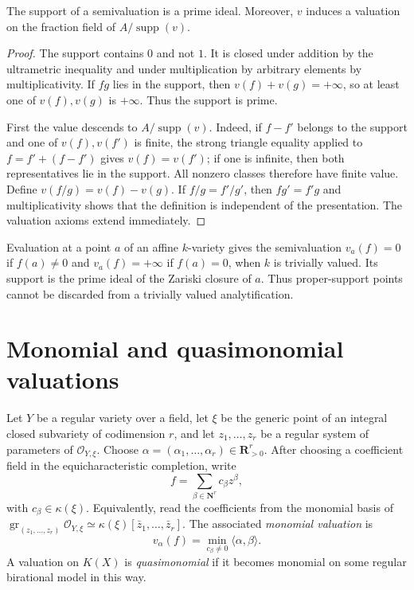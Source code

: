 \begin{proposition}
\label{prop:semivaluation-support-prime}
The support of a semivaluation is a prime ideal. Moreover, $v$ induces a
valuation on the fraction field of $A/\operatorname{supp}(v)$.
\end{proposition}
\begin{proof}
The support contains $0$ and not $1$. It is closed under addition by the
ultrametric inequality and under multiplication by arbitrary elements by
multiplicativity. If $fg$ lies in the support, then
$v(f)+v(g)=+\infty$, so at least one of $v(f),v(g)$ is $+\infty$.
Thus the support is prime.

First the value descends to $A/\operatorname{supp}(v)$.  Indeed, if
$f-f'$ belongs to the support and one of $v(f),v(f')$ is finite, the strong
triangle equality applied to $f=f'+(f-f')$ gives $v(f)=v(f')$; if one is
infinite, then both representatives lie in the support.  All nonzero classes
therefore have finite value.  Define $v(f/g)=v(f)-v(g)$. If
$f/g=f'/g'$, then $fg'=f'g$ and multiplicativity shows that the definition
is independent of the presentation. The valuation axioms extend immediately.
\end{proof}

\begin{example}\label{ex:trivial-point-evaluation-semivaluation}
Evaluation at a point $a$ of an affine $k$-variety gives the semivaluation
$v_a(f)=0$ if $f(a)\ne0$ and $v_a(f)=+\infty$ if $f(a)=0$, when $k$ is
trivially valued. Its support is the prime ideal of the Zariski closure of
$a$. Thus proper-support points cannot be discarded from a trivially valued
analytification.
\end{example}

\section{Monomial and quasimonomial valuations}

\begin{definition}\label{def:monomial-quasimonomial-valuation}
Let $Y$ be a regular variety over a field, let $\xi$ be the generic point
of an integral closed subvariety of codimension $r$, and let
$z_1,\ldots,z_r$ be a regular system of parameters of
$\mathcal O_{Y,\xi}$. Choose
$\alpha=(\alpha_1,\ldots,\alpha_r)\in\mathbf R_{>0}^r$.  After choosing a
coefficient field in the equicharacteristic completion, write
\[
 f=\sum_{\beta\in\mathbf N^r}c_\beta z^\beta,
\]
with $c_\beta\in\kappa(\xi)$.  Equivalently, read the coefficients from
the monomial basis of
$\operatorname{gr}_{(z_1,\ldots,z_r)}\mathcal O_{Y,\xi}
\simeq\kappa(\xi)[\bar z_1,\ldots,\bar z_r]$.  The
associated \emph{monomial valuation} is
\[
                     v_\alpha(f)=
       \min_{c_\beta\ne0}\langle\alpha,\beta\rangle.
\]
A valuation on $K(X)$ is \emph{quasimonomial} if it becomes monomial on some
regular birational model in this way.
\end{definition}

